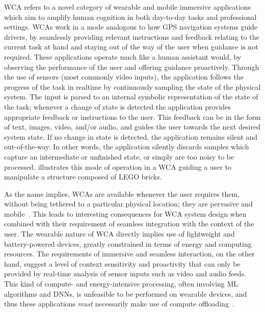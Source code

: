 \gls{WCA} refers to a novel category of wearable and mobile immersive applications which aim to amplify human cognition in both day-to-day tasks and professional settings.
\glspl{WCA} work in a mode analogous to how \gls{GPS} navigation systems guide drivers, by seamlessly providing relevant instructions and feedback relating to the current task at hand and staying out of the way of the user when guidance is not required.
These applications operate much like a human assistant would, by observing the performance of the user and offering guidance proactively.
Through the use of sensors (most commonly video inputs), the application follows the progress of the task in realtime by continuously sampling the state of the physical system.
The input is parsed to an internal symbolic representation of the state of the task;
whenever a change of state is detected the application provides appropriate feedback or instructions to the user.
This feedback can be in the form of text, images, video, and/or audio, and guides the user towards the next desired system state.
If no change in state is detected, the application remains silent and out-of-the-way.
In other words, the application silently discards samples which capture an intermediate or unfinished state, or simply are too noisy to be processed.
 illustrates this mode of operation in a \gls{WCA} guiding a user to manipulate a structure composed of LEGO bricks.

As the name implies, \glspl{WCA} are available whenever the user requires them, without being tethered to a particular physical location;
they are pervasive and mobile~\cite{ha2014towards}.
This leads to interesting consequences for \gls{WCA} system design when combined with their requirement of seamless integration with the context of the user.
The wearable nature of \gls{WCA} directly implies use of lightweight and battery-powered devices, greatly constrained in terms of energy and computing resources.
The requirements of immersive and seamless interaction, on the other hand, suggest a level of context sensitivity and proactivity that can only be provided by real-time analysis of sensor inputs such as video and audio feeds.
This kind of compute- and energy-intensive processing, often involving \gls{ML} algorithms and \glspl{DNN}, is unfeasible to be performed on wearable devices, and thus these applications \emph{must} necessarily make use of compute offloading~\cite{ha2014towards,wang2020scaling}.


